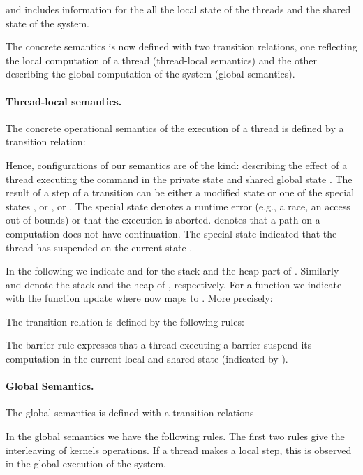 \documentclass[a4paper,11pt]{llncs}
\newcounter{note_number}
\begin{document}
and includes information for the all the local state of the threads and the shared state of the system.

The concrete semantics is now defined with two transition relations, one reflecting the local computation of a thread (thread-local semantics) and the other describing the global computation of the system (global semantics).

\paragraph{Thread-local semantics.}
The concrete operational semantics of the execution of a thread is defined by a transition relation: 

Hence, configurations of our semantics are of the kind: 
 describing the effect of a thread executing the command  in the private state  and shared global state .
The result of a step of a transition can be either a modified state  or 
one of the special states , or ,  or .
The special state  denotes a runtime error (e.g., a race, an access out of bounds) or that the execution is aborted.  denotes that a path on a computation does not have continuation.
The special state  indicated that the thread has suspended on the current state .

In the following we indicate  and  for the stack and the heap part of . Similarly  and  denote the stack and the heap of , respectively. For a function  we indicate with  the function update where  now maps to . More precisely:



The transition relation is defined by the following rules:











The barrier rule expresses  that a thread executing a barrier suspend its computation in the current local and shared state (indicated by ).

\paragraph{Global Semantics.}
The global semantics is defined with a transition relations

In the global semantics we have the following rules. The first two rules give the interleaving of kernels operations. If a thread makes a local step, this is observed in the global 
execution of the system. 
\end{document}
